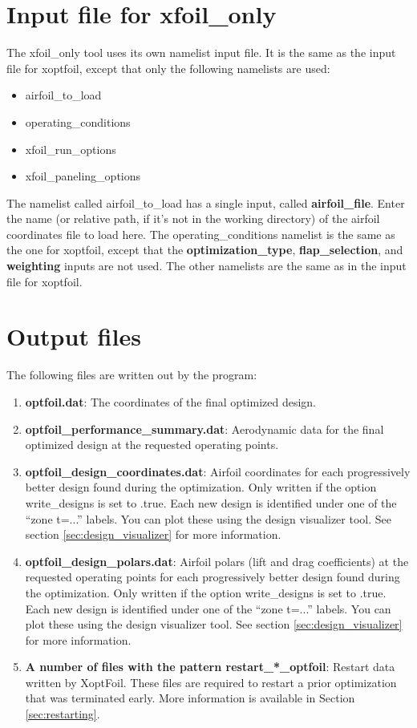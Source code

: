 \documentclass[11pt]{article}
\begin{document}
\section{Input file for xfoil\_only}

The xfoil\_only tool uses its own namelist input file.  It is the same as the input file
for xoptfoil, except that only the following namelists are used:

\begin{itemize}
\item{airfoil\_to\_load}
\item{operating\_conditions}
\item{xfoil\_run\_options}
\item{xfoil\_paneling\_options}
\end{itemize}

The namelist called airfoil\_to\_load has a single input, called \textbf{airfoil\_file}.
Enter the name (or relative path, if it's not in the working directory) of the airfoil 
coordinates file to load here.  The operating\_conditions namelist is the same as the one
for xoptfoil, except that the \textbf{optimization\_type}, \textbf{flap\_selection}, and 
\textbf{weighting} inputs are not used. The other namelists are the same as in the input 
file for xoptfoil.

\section{Output files}\label{sec:output_files}

The following files are written out by the program:

\begin{enumerate}
\item{\textbf{optfoil.dat}: The coordinates of the final optimized design.}
\item{\textbf{optfoil\_performance\_summary.dat}: Aerodynamic data for the final optimized
design at the requested operating points.}
\item{\textbf{optfoil\_design\_coordinates.dat}: Airfoil coordinates for each
progressively better design found during the optimization.  Only written if the option
write\_designs is set to .true.  Each new design is identified under one of the ``zone
t=...'' labels.  You can plot these using the design visualizer tool. See section 
\ref{sec:design_visualizer} for more information.}
\item{\textbf{optfoil\_design\_polars.dat}: Airfoil polars (lift and drag coefficients) at
the requested operating points for each progressively better design found during the 
optimization.  Only written if the option write\_designs is set to .true.  Each new design
is identified under one of the ``zone t=...'' labels.  You can plot these using the design
visualizer tool. See section \ref{sec:design_visualizer} for more information.}
\item{\textbf{A number of files with the pattern restart\_*\_optfoil}: Restart data
written by XoptFoil.  These files are required to restart a prior optimization that was
terminated early. More information is available in Section \ref{sec:restarting}.}
\end{enumerate}
\end{document}
